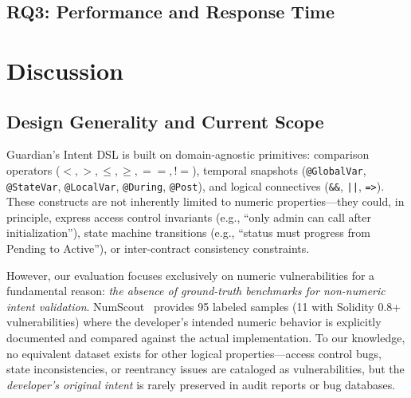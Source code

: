\documentclass[pdflatex,sn-basic]{sn-jnl}%
\theoremstyle{thmstyleone}%
\theoremstyle{thmstyletwo}%
\theoremstyle{thmstylethree}%
\begin{document}


\subsection{RQ3: Performance and Response Time}
\label{sec:rq3}



\section{Discussion}

\subsection{Design Generality and Current Scope}

Guardian's Intent DSL is built on domain-agnostic primitives: comparison operators ($<, >, \leq, \geq, ==, !=$), temporal snapshots (\texttt{@GlobalVar}, \texttt{@StateVar}, \texttt{@LocalVar}, \texttt{@During}, \texttt{@Post}), and logical connectives (\texttt{\&\&}, \texttt{||}, \texttt{=>}). These constructs are not inherently limited to numeric properties—they could, in principle, express access control invariants (e.g., ``only admin can call after initialization''), state machine transitions (e.g., ``status must progress from Pending to Active''), or inter-contract consistency constraints.

However, our evaluation focuses exclusively on numeric vulnerabilities for a fundamental reason: \textit{the absence of ground-truth benchmarks for non-numeric intent validation}. NumScout~\citep{numscout} provides 95 labeled samples (11 with Solidity 0.8+ vulnerabilities) where the developer's intended numeric behavior is explicitly documented and compared against the actual implementation. To our knowledge, no equivalent dataset exists for other logical properties—access control bugs, state inconsistencies, or reentrancy issues are cataloged as vulnerabilities, but the \textit{developer's original intent} is rarely preserved in audit reports or bug databases.
\end{document}
